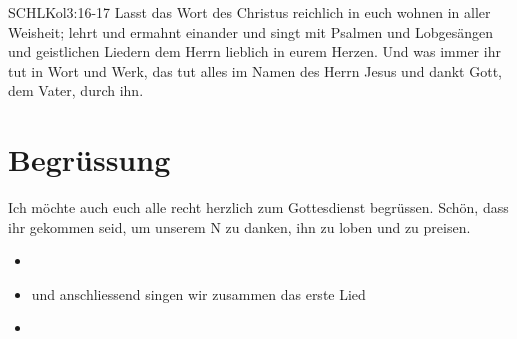 \documentclass[fontsize=14pt]{mybib}
\author{OTS}
\begin{document}
\begin{bibelbox}{SCHL}{Kol}{3:16-17}
    Lasst das Wort des Christus reichlich in euch wohnen in aller Weisheit; lehrt und ermahnt einander und singt mit Psalmen und Lobgesängen und geistlichen Liedern dem Herrn lieblich in eurem Herzen. Und was immer ihr tut in Wort und Werk, das tut alles im Namen des Herrn Jesus und dankt Gott, dem Vater, durch ihn.
\end{bibelbox}
\section{Begrüssung}
Ich möchte auch euch alle recht herzlich zum Gottesdienst begrüssen. Schön, dass ihr gekommen seid, um unserem \herr N zu danken, ihn zu loben und zu preisen. 

\begin{itemize}
    \item {}
    \item und anschliessend singen wir zusammen das erste Lied
    \item {}
\end{itemize}
\end{document}

